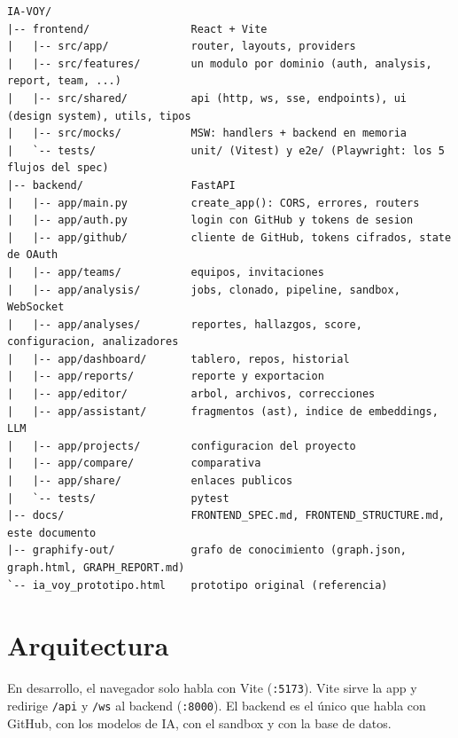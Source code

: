 \documentclass[11pt,a4paper]{article}
\newcommand{\code}[1]{\texttt{\small #1}}
\begin{document}
\begin{lstlisting}[language=texto]
IA-VOY/
|-- frontend/                React + Vite
|   |-- src/app/             router, layouts, providers
|   |-- src/features/        un modulo por dominio (auth, analysis, report, team, ...)
|   |-- src/shared/          api (http, ws, sse, endpoints), ui (design system), utils, tipos
|   |-- src/mocks/           MSW: handlers + backend en memoria
|   `-- tests/               unit/ (Vitest) y e2e/ (Playwright: los 5 flujos del spec)
|-- backend/                 FastAPI
|   |-- app/main.py          create_app(): CORS, errores, routers
|   |-- app/auth.py          login con GitHub y tokens de sesion
|   |-- app/github/          cliente de GitHub, tokens cifrados, state de OAuth
|   |-- app/teams/           equipos, invitaciones
|   |-- app/analysis/        jobs, clonado, pipeline, sandbox, WebSocket
|   |-- app/analyses/        reportes, hallazgos, score, configuracion, analizadores
|   |-- app/dashboard/       tablero, repos, historial
|   |-- app/reports/         reporte y exportacion
|   |-- app/editor/          arbol, archivos, correcciones
|   |-- app/assistant/       fragmentos (ast), indice de embeddings, LLM
|   |-- app/projects/        configuracion del proyecto
|   |-- app/compare/         comparativa
|   |-- app/share/           enlaces publicos
|   `-- tests/               pytest
|-- docs/                    FRONTEND_SPEC.md, FRONTEND_STRUCTURE.md, este documento
|-- graphify-out/            grafo de conocimiento (graph.json, graph.html, GRAPH_REPORT.md)
`-- ia_voy_prototipo.html    prototipo original (referencia)
\end{lstlisting}

\section{Arquitectura}

En desarrollo, el navegador solo habla con Vite (\code{:5173}). Vite sirve la app y redirige \code{/api} y \code{/ws}
al backend (\code{:8000}). El backend es el único que habla con GitHub, con los modelos de IA, con el sandbox y con la
base de datos.
\end{document}
